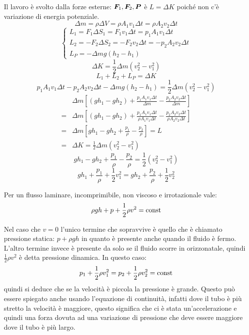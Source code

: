 Il lavoro è svolto dalla forze esterne: $\boldsymbol{F}_1, \boldsymbol{F}_2, \boldsymbol{P}$ è $L=\Delta K$ poiché non c'è variazione di energia potenziale.
\[\Delta m=\rho \Delta V=\rho A_1 v_1\Delta t=\rho A_2 v_2 \Delta t\]
\[
   \left\{
   \begin{array}{lll}
      L_1=F_1\Delta S_1=F_1v_1\Delta t=p_1A_1v_1\Delta t    \\
      L_2=-F_2\Delta S_2=-F_2v_2\Delta t=-p_2A_2v_2\Delta t \\
      L_P=-\Delta mg(h_2-h_1)
   \end{array}
   \right.
\]
\[\Delta K=\frac{1}{2}\Delta m(v_2^2-v_1^2)\]
\[L_1+L_2+L_P=\Delta K\]
\[p_1A_1v_1\Delta t-p_2A_2v_2\Delta t-\Delta mg(h_2-h_1)=\frac{1}{2}\Delta m(v_2^2-v_1^2)\]
\begin{align*}
     & \Delta m\left[\left(gh_1-gh_2\right)+\frac{p_1A_1v_1\Delta t}{\Delta m}-\frac{p_2A_2v_2\Delta t}{\Delta m}\right]                       \\
   = & \Delta m\left[\left(gh_1-gh_2\right)+\frac{p_1A_1v_1\Delta t}{\rho A_1v_1\Delta t}-\frac{p_2A_2v_2\Delta t}{\rho A_2v_2\Delta t}\right] \\
   = & \Delta m\left[gh_1-gh_2+\frac{p_1}{\rho}-\frac{p_2}{\rho}\right]=L                                                                      \\
   = & \Delta K=\frac{1}{2}\Delta m(v_2^2-v_1^2)
\end{align*}
\[gh_1-gh_2+\frac{p_1}{\rho}-\frac{p_2}{\rho}=\frac{1}{2}(v_2^2-v_1^2)\]
\[gh_1+\frac{p_1}{\rho}+\frac{1}{2}v_1^2=gh_2+\frac{p_2}{\rho}+\frac{1}{2}v_2^2\]
\begin{Teo}[Bernoulli]
   Per un flusso laminare, incomprimibile, non viscoso e irrotazionale vale:
   \begin{equation}
      \rho gh+p+\frac{1}{2}\rho v^2=\text{const}
   \end{equation}
\end{Teo}
Nel caso che $v=0$ l'unico termine che sopravvive è quello che è chiamato pressione statica: $p+\rho gh$ in quanto è presente anche quando il fluido è fermo. L'altro termine invece è presente da solo se il fluido scorre in orizzonatale, quindi $\frac{1}{2}\rho v^2$ è detta pressione dinamica. In questo caso:
\[
   p_1+\frac{1}{2}\rho v_1^2=p_2+\frac{1}{2}\rho v_2^2=\text{const}
\]
quindi si deduce che se la velocità è piccola la pressione è grande. Questo può essere spiegato anche usando l'equazione di continuità, infatti dove il tubo è più stretto la velocità è maggiore, questo significa che ci è stata un'accelerazione e quindi una forza dovuta ad una variazione di pressione che deve essere maggiore dove il tubo è più largo.

